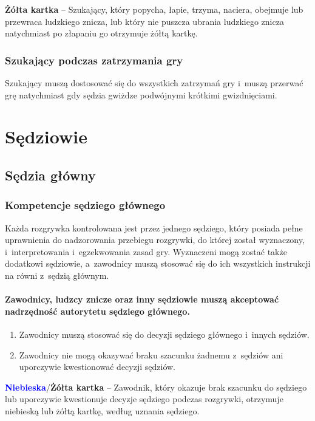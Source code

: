 \documentclass[12pt,a4paper]{article}
\newcommand\yellowcard[1]{\bgroup\textcolor{darkyellow}{\textbf{#1}}}
\newcommand\bluecard[1]{\bgroup\textcolor{blue}{\textbf{#1}}}
\begin{document}
\yellowcard{Żółta kartka} -- Szukający, który popycha, łapie, trzyma, naciera,
obejmuje lub przewraca ludzkiego znicza, lub który nie puszcza ubrania
ludzkiego znicza natychmiast po złapaniu go otrzymuje żółtą kartkę.

\subsubsection{Szukający podczas zatrzymania gry}

Szukający muszą dostosować się do wszystkich zatrzymań gry i~muszą
przerwać grę natychmiast gdy sędzia gwiżdze podwójnymi krótkimi
gwizdnięciami.

\pagebreak
\section{Sędziowie}

\subsection{Sędzia główny}

\subsubsection{Kompetencje sędziego głównego}

Każda rozgrywka kontrolowana jest przez jednego sędziego, który posiada
pełne uprawnienia do nadzorowania przebiegu rozgrywki, do której został
wyznaczony, i~interpretowania i~egzekwowania zasad gry. Wyznaczeni mogą
zostać także dodatkowi sędziowie, a~zawodnicy muszą stosować się do ich
wszystkich instrukcji na równi z~sędzią głównym.

\paragraph{Zawodnicy, ludzcy znicze oraz inny sędziowie muszą
	akceptować nadrzędność autorytetu sędziego głównego.}

\begin{enumerate}
	\item
	      Zawodnicy muszą stosować się do decyzji sędziego głównego i~innych
	      sędziów.
	\item
	      Zawodnicy nie mogą okazywać braku szacunku żadnemu z~sędziów ani
	      uporczywie kwestionować decyzji sędziów.
\end{enumerate}

\bluecard{Niebieska}/\yellowcard{Żółta kartka} -- Zawodnik, który okazuje brak szacunku do
sędziego lub uporczywie kwestionuje decyzje sędziego podczas rozgrywki,
otrzymuje niebieską lub żółtą kartkę, według uznania sędziego.
\end{document}
